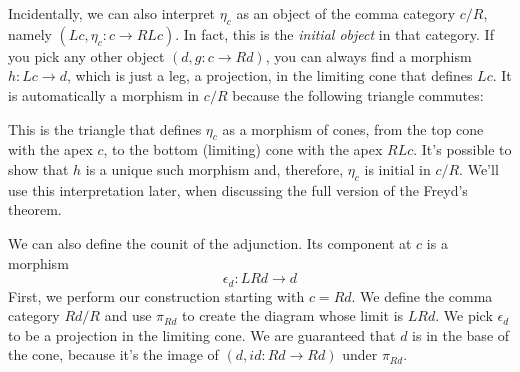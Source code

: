 \documentclass[11pt]{amsart}
\begin{document}
\begin{figure}[H]
\end{figure}



Incidentally, we can also interpret $\eta_c$ as an object of the comma category $c/R$, namely $(Lc, \eta_c \colon c \to R L c)$. In fact, this is the \emph{initial object} in that category. If you pick any other object $(d, g \colon c \to R d)$, you can always find a morphism $h \colon L c \to d$, which is just a leg, a projection, in the limiting cone that defines $L c$. It is automatically a morphism in $c/R$ because the following triangle commutes:

\begin{figure}[H]
\centering
\end{figure}
This is the triangle that defines $\eta_c$ as a morphism of cones, from the top cone with the apex $c$, to the bottom (limiting) cone with the apex $R L c$. It's possible to show that $h$ is a unique such morphism and, therefore, $\eta_c$ is initial in $c/R$. We'll use this interpretation later, when discussing the full version of the Freyd's theorem.

We can also define the counit of the adjunction. Its component at $c$ is a morphism
\[\epsilon_d : L R d \to d \]
First, we perform our construction starting with $c = R d$. We define the comma category $R d / R$ and use $\pi_{R d}$ to create the diagram whose limit is $L R d$. We pick $\epsilon_d$ to be a projection in the limiting cone. We are guaranteed that $d$ is in the base of the cone, because it's the image of $(d, id \colon R d \to R d)$ under $\pi_{R d}$. 
\end{document}
